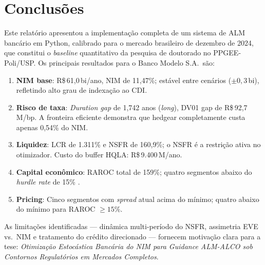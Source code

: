 \documentclass[12pt, a4paper, oneside]{article}
\newcommand{\brlM}[1]{R\$\,#1\,M}
\begin{document}
\section{Conclusões}
\label{sec:conclusoes}

Este relatório apresentou a implementação completa de um sistema de ALM
bancário em Python, calibrado para o mercado brasileiro de dezembro de 2024,
que constitui o \textit{baseline} quantitativo da pesquisa de doutorado no
PPGEE-Poli/USP. Os principais resultados para o Banco Modelo S.A.\ são:

\begin{enumerate}
  \item \textbf{NIM base}: R\$\,61,0\,bi/ano, NIM de 11,47\%; estável entre
    cenários ($\pm 0{,}3$\,bi), refletindo alto grau de indexação ao CDI.

  \item \textbf{Risco de taxa}: \textit{Duration gap} de 1,742 anos
    (\textit{long}), DV01 gap de R\$\,92,7\,M/bp. A fronteira eficiente
    demonstra que hedgear completamente custa apenas 0,54\% do NIM.

  \item \textbf{Liquidez}: LCR de 1.311\% e NSFR de 160,9\%; o NSFR é a
    restrição ativa no otimizador. Custo do buffer HQLA: \brlM{9.400}/ano.

  \item \textbf{Capital econômico}: RAROC total de 159\%; quatro segmentos
    abaixo do \textit{hurdle rate} de 15\% \citep{Bonomo2016}.

  \item \textbf{Pricing}: Cinco segmentos com \textit{spread} atual acima
    do mínimo; quatro abaixo do mínimo para RAROC $\geq 15\%$.
\end{enumerate}

As limitações identificadas --- dinâmica multi-período do NSFR, assimetria
EVE vs.\ NIM e tratamento do crédito direcionado --- fornecem motivação
clara para a tese:
\textit{Otimização Estocástica Bancária do NIM para Guidance ALM-ALCO
sob Contornos Regulatórios em Mercados Completos}.

\newpage
\renewcommand{\bibname}{REFERÊNCIAS}
\end{document}
